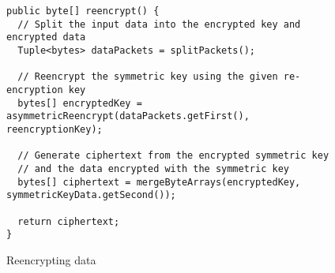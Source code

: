\begin{figure}[H]
  \centering
  \begin{verbatim}
public byte[] reencrypt() {
  // Split the input data into the encrypted key and encrypted data
  Tuple<bytes> dataPackets = splitPackets();

  // Reencrypt the symmetric key using the given re-encryption key
  bytes[] encryptedKey = asymmetricReencrypt(dataPackets.getFirst(), reencryptionKey);

  // Generate ciphertext from the encrypted symmetric key
  // and the data encrypted with the symmetric key
  bytes[] ciphertext = mergeByteArrays(encryptedKey, symmetricKeyData.getSecond());

  return ciphertext;
}
  \end{verbatim}
  \caption{Reencrypting data}
  \label{code:reencrypt_data}
\end{figure}
